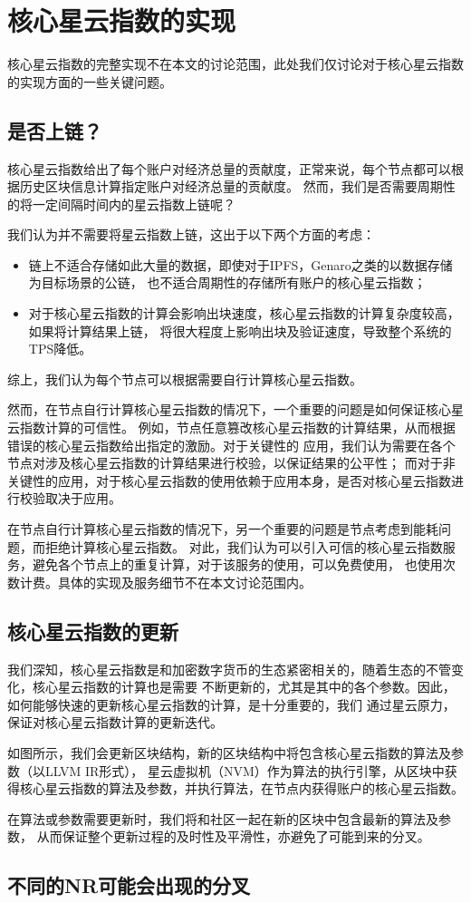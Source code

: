 \section{核心星云指数的实现}
核心星云指数的完整实现不在本文的讨论范围，此处我们仅讨论对于核心星云指数的实现方面的一些关键问题。

\subsection{是否上链？\label{sec:onchain?}}
核心星云指数给出了每个账户对经济总量的贡献度，正常来说，每个节点都可以根据历史区块信息计算指定账户对经济总量的贡献度。
然而，我们是否需要周期性的将一定间隔时间内的星云指数上链呢？

我们认为并不需要将星云指数上链，这出于以下两个方面的考虑：
\begin{itemize}
\item 链上不适合存储如此大量的数据，即使对于IPFS，Genaro之类的以数据存储为目标场景的公链，
也不适合周期性的存储所有账户的核心星云指数；
\item 对于核心星云指数的计算会影响出块速度，核心星云指数的计算复杂度较高，如果将计算结果上链，
将很大程度上影响出块及验证速度，导致整个系统的TPS降低。
\end{itemize}
\noindent 综上，我们认为每个节点可以根据需要自行计算核心星云指数。

然而，在节点自行计算核心星云指数的情况下，一个重要的问题是如何保证核心星云指数计算的可信性。
例如，节点任意篡改核心星云指数的计算结果，从而根据错误的核心星云指数给出指定的激励。对于关键性的
应用，我们认为需要在各个节点对涉及核心星云指数的计算结果进行校验，以保证结果的公平性；
而对于非关键性的应用，对于核心星云指数的使用依赖于应用本身，是否对核心星云指数进行校验取决于应用。

在节点自行计算核心星云指数的情况下，另一个重要的问题是节点考虑到能耗问题，而拒绝计算核心星云指数。
对此，我们认为可以引入可信的核心星云指数服务，避免各个节点上的重复计算，对于该服务的使用，可以免费使用，
也使用次数计费。具体的实现及服务细节不在本文讨论范围内。

\subsection{核心星云指数的更新}
我们深知，核心星云指数是和加密数字货币的生态紧密相关的，随着生态的不管变化，核心星云指数的计算也是需要
不断更新的，尤其是其中的各个参数。因此，如何能够快速的更新核心星云指数的计算，是十分重要的，我们
通过星云原力，保证对核心星云指数计算的更新迭代。

如图所示，我们会更新区块结构，新的区块结构中将包含核心星云指数的算法及参数（以LLVM IR形式），
星云虚拟机（NVM）作为算法的执行引擎，从区块中获得核心星云指数的算法及参数，并执行算法，在节点内获得账户的核心星云指数。

在算法或参数需要更新时，我们将和社区一起在新的区块中包含最新的算法及参数，
从而保证整个更新过程的及时性及平滑性，亦避免了可能到来的分叉。

\subsection{不同的NR可能会出现的分叉}
